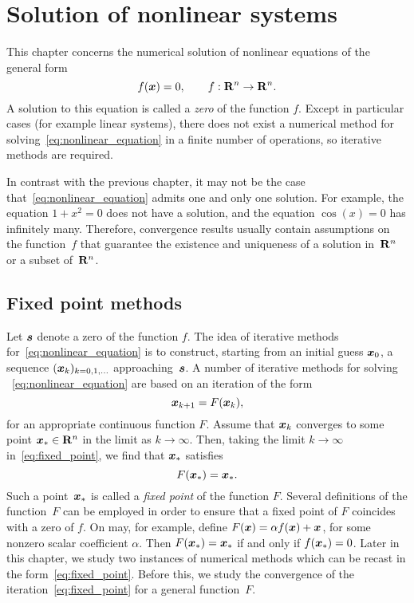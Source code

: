\chapter{Solution of nonlinear systems}
\label{cha:solution_of_nonlinear_systems}

This chapter concerns the numerical solution of nonlinear equations of the general form
\begin{equation}
    \label{eq:nonlinear_equation}
    f(\mathbf{\boldsymbol{x}}) = 0, \qquad f: \mathbf R^n \to \mathbf R^n.
\end{equation}
A solution to this equation is called a \emph{zero} of the function $f$.
Except in particular cases (for example linear systems),
there does not exist a numerical method for solving~\eqref{eq:nonlinear_equation} in a finite number of operations,
so iterative methods are required.

In contrast with the previous chapter,
it may not be the case that~\eqref{eq:nonlinear_equation} admits one and only one solution.
For example, the equation $1 + x^2 = 0$ does not have a solution,
and the equation $\cos(x) = 0$ has infinitely many.
Therefore, convergence results usually contain assumptions on the function~$f$ that guarantee the existence and uniqueness of a solution in~$\mathbf R^n$ or a subset of~$\mathbf R^n$.

\section{Fixed point methods}

Let $\mathbf{\boldsymbol{s}}$ denote a zero of the function $f$.
The idea of iterative methods for~\eqref{eq:nonlinear_equation} is to construct,
starting from an initial guess $\mathbf{\boldsymbol{x}}_0$,
a sequence $(\mathbf{\boldsymbol{x}}_k)_{k=0, 1, \dotsc}$ approaching~$\mathbf{\boldsymbol{s}}$.
A number of iterative methods for solving ~\eqref{eq:nonlinear_equation} are based on an iteration of the form
\begin{equation}
    \label{eq:fixed_point}
    \mathbf{\boldsymbol{x}}_{k+1} = F(\mathbf{\boldsymbol{x}}_{k}),
\end{equation}
for an appropriate continuous function $F$.
Assume that $\mathbf{\boldsymbol{x}}_k$ converges to some point $\mathbf{\boldsymbol{x}}_* \in \mathbf R^n$ in the limit as $k \to \infty$.
Then, taking the limit $k \to \infty$ in~\eqref{eq:fixed_point},
we find that $\mathbf{\boldsymbol{x}}_*$ satisfies
\[
    F(\mathbf{\boldsymbol{x}}_*) = \mathbf{\boldsymbol{x}}_*.
\]
Such a point~$\mathbf{\boldsymbol{x}}_*$ is called a \emph{fixed point} of the function $F$.
Several definitions of the function~$F$ can be employed in order to ensure that
a fixed point of $F$ coincides with a zero of $f$.
On may, for example, define $F(\mathbf{\boldsymbol{x}}) = \alpha f(\mathbf{\boldsymbol{x}}) + \mathbf{\boldsymbol{x}}$,
for some nonzero scalar coefficient $\alpha$.
Then $F(\mathbf{\boldsymbol{x}}_*) = \mathbf{\boldsymbol{x}}_*$ if and only if $f(\mathbf{\boldsymbol{x}}_*) = 0$.
Later in this chapter,
we study two instances of numerical methods which can be recast in the form~\eqref{eq:fixed_point}.
Before this,
we study the convergence of the iteration~\eqref{eq:fixed_point} for a general function~$F$.


